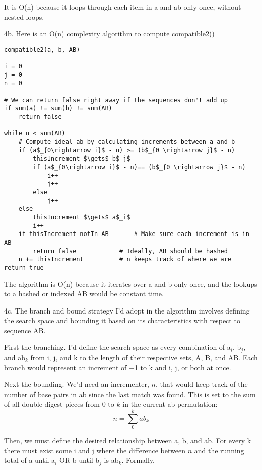 \documentclass[12pt]{amsart}
\begin{document}
It is O(n) because it loops through each item in a and ab only once, without nested loops.

\pagebreak[4]
4b. Here is an O(n) complexity algorithm to compute compatible2()

\begin{lstlisting}[mathescape=true]
compatible2(a, b, AB)

i = 0
j = 0
n = 0

# We can return false right away if the sequences don't add up
if sum(a) != sum(b) != sum(AB)
	return false

while n < sum(AB)
	# Compute ideal ab by calculating increments between a and b
	if (a$_{0\rightarrow i}$ - n) >= (b$_{0 \rightarrow j}$ - n)
		thisIncrement $\gets$ b$_j$ 
		if (a$_{0\rightarrow i}$ - n)== (b$_{0 \rightarrow j}$ - n)
			i++
			j++
		else
			j++
	else
		thisIncrement $\gets$ a$_i$ 
		i++
	if thisIncrement notIn AB    	# Make sure each increment is in AB
		return false			# Ideally, AB should be hashed 
	n += thisIncrement			# n keeps track of where we are
return true

\end{lstlisting}	

The algorithm is O(n) because it iterates over a and b only once, and the lookups to a hashed or indexed AB would be constant time. 	

\pagebreak[4]
4c.  The branch and bound strategy I'd adopt in the algorithm involves defining the search space and bounding it based on its characteristics with respect to sequence AB.  

First the branching.  I'd define the search space as every combination of a$_i$, b$_j$, and ab$_k$ from i, j, and k to the length of their respective sets, A, B, and AB.  Each branch would represent an increment of +1 to k and i, j, or both at once.  

Next the bounding.  We'd need an incrementer, $n$, that would keep track of the number of base pairs in ab since the last match was found.  This is set to the sum of all double digest pieces from 0 to $k$ in the current ab permutation:
\begin{displaymath}
n = \sum\limits_0^k ab_k \end{displaymath}


Then, we must define the desired relationship between a, b, and ab.  For every k there must exist some i and j where the difference between $n$ and the running total of a until a$_i$ OR b until b$_j$ is ab$_k$.  Formally,
\end{document}
